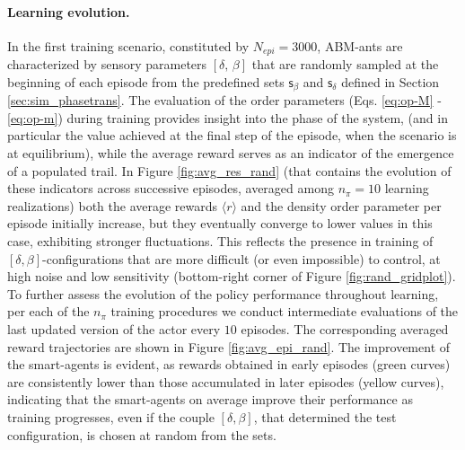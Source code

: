 \paragraph{Learning evolution.}
In the first training scenario, constituted by $N_{epi} = 3000$, ABM-ants are characterized by sensory parameters $\left[\delta, \, \beta \right]$ that are randomly sampled at the beginning of each episode from the predefined sets $\mathsf{s}_\beta$ and $\mathsf{s}_\delta$ defined in Section \ref{sec:sim_phasetrans}. The evaluation of the order parameters (Eqs. \ref{eq:op-M} - \ref{eq:op-m}) during training provides insight into the phase of the system, (and in particular the value achieved at the final step of the episode, when the scenario is at equilibrium), while the average reward serves as an indicator of the emergence of a populated trail. 
In Figure \ref{fig:avg_res_rand} (that contains the evolution of these indicators across successive episodes, averaged among $n_{\pi} = 10$ learning realizations) both the average rewards $\langle r \rangle$ and the density order parameter per episode  initially increase, but they eventually converge to lower values in this case, exhibiting stronger fluctuations. This reflects the presence in training of $\left[\delta , \beta \right]$-configurations that are more difficult (or even impossible) to control, at high noise and low sensitivity (bottom-right corner of Figure \ref{fig:rand_gridplot}). To further assess the evolution of the policy performance throughout learning, per each of the $n_{\pi}$ training procedures we conduct intermediate evaluations of the last updated version of the actor every $10$ episodes. The corresponding averaged reward trajectories are shown in Figure \ref{fig:avg_epi_rand}. The improvement of the smart-agents is evident, as rewards obtained in early episodes (green curves) are consistently lower than those accumulated in later episodes (yellow curves), indicating that the smart-agents on average improve their performance as training progresses, even if the couple $\left[\delta , \beta \right]$, that determined the test configuration, is chosen at random from the sets. 

